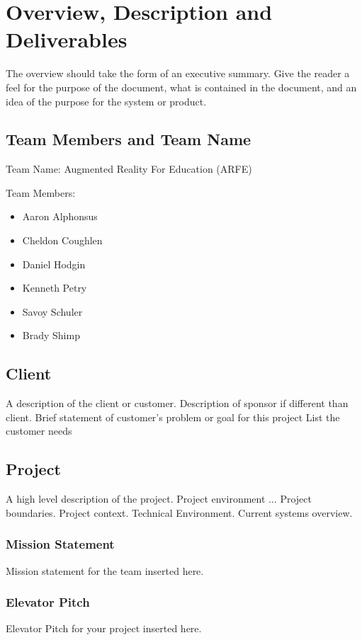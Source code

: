 

\chapter{Overview, Description and Deliverables}

The overview should take the form of an executive summary.  Give the reader a feel 
for the purpose of the document, what is contained in the document, and an idea 
of the purpose for the system or product. 

\section{Team Members and Team Name}

Team Name: Augmented Reality For Education (ARFE)

\noindent Team Members:
\begin{itemize}
	\item Aaron Alphonsus
	\item Cheldon Coughlen
	\item Daniel Hodgin
	\item Kenneth Petry
	\item Savoy Schuler
	\item Brady Shimp
\end{itemize}

\section{Client}
A description of the client or customer.
Description of sponsor if different than client.
Brief statement of customer's problem or goal for this project
List the customer needs

\section{Project}
A high level description of the project.  Project environment ...
Project boundaries.
Project context.
Technical Environment.
Current systems overview.


\subsection{Mission Statement}
Mission statement for the team inserted here.   

\subsection{Elevator Pitch}
Elevator Pitch for your project inserted here.   

